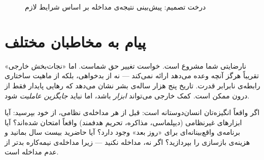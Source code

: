 \begin{figure}[htbp]
\caption{درخت تصمیم: پیش‌بینی نتیجه‌ی مداخله بر اساس شرایط لازم}
\label{fig:ch14-decision-tree}
\end{figure}


\section{پیام به مخاطبان مختلف}
\label{sec:ch14-messages}


\begin{tcolorbox}[wavebox, title={پیام به ملت‌های تحت فشار}]
نارضایتی شما مشروع است. خواست تغییر حق شماست. اما «نجات‌بخش خارجی» تقریباً هرگز آنچه وعده می‌دهد ارائه نمی‌کند — نه از بدخواهی، بلکه از ماهیت ساختاری رابطه‌ی نابرابر قدرت. تاریخ پنج هزار ساله‌ی بشر نشان می‌دهد که رهایی پایدار فقط از درون ممکن است. کمک خارجی می‌تواند \textit{ابزار} باشد، اما نباید \textit{جایگزین عاملیت} شود.
\end{tcolorbox}

\begin{tcolorbox}[wavebox, title={پیام به مداخله‌گران بالقوه}]
اگر واقعاً انگیزه‌تان انسان‌دوستانه است: قبل از هر مداخله‌ی نظامی، از خود بپرسید: آیا ابزارهای غیرنظامی (دیپلماسی، مذاکره، تحریم هدفمند) واقعاً امتحان شده‌اند؟ آیا برنامه‌ی واقع‌بینانه‌ای برای «روز بعد» وجود دارد؟ آیا حاضرید بیست سال بمانید و هزینه‌ی بازسازی را بپردازید؟ اگر نه، مداخله نکنید — زیرا مداخله‌ی نیمه‌کاره بدتر از عدم مداخله است.
\end{tcolorbox}


